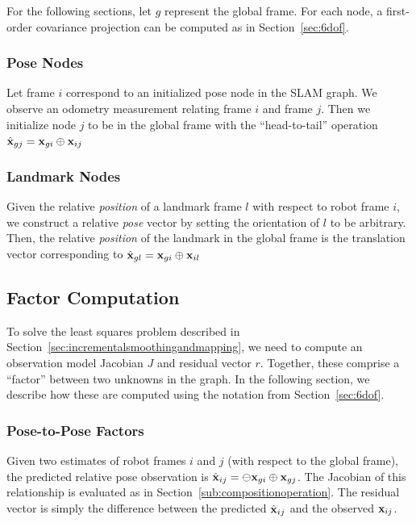 \documentclass[conference]{IEEEtran}
\begin{document}
For the following sections, let $g$ represent the global frame.  For each node, a
first-order covariance projection can be computed as in Section~\ref{sec:6dof}.

\subsubsection{Pose Nodes}
\label{subs:posenodeinit}

Let frame $i$ correspond to an initialized pose node in the \ac{SLAM} graph.  We observe an
odometry measurement relating frame $i$ and frame $j$.  Then we initialize node $j$ to be
in the global frame with the ``head-to-tail'' operation $ {\hat {\bf x}_{gj}} = {\bf
  x}_{gi} \oplus {\bf x}_{ij} $

\subsubsection{Landmark Nodes}
\label{subs:pointnodeinit}
Given the relative {\it position} of a landmark frame $l$ with respect to robot frame $i$,
we construct a relative {\it pose} vector by setting the orientation of $l$ to be
arbitrary.  Then, the relative {\it position} of the landmark in the global frame is the
translation vector corresponding to $ {\hat {\bf x}}_{gl} = {\bf x}_{gi} \oplus {\bf
 x}_{il} $

\subsection{Factor Computation}
\label{sub:nodeinitializationandedgeresiduals}

To solve the least squares problem described in
Section~\ref{sec:incrementalsmoothingandmapping}, we need to compute an observation model
Jacobian $J$ and residual vector $r$.  Together, these comprise a ``factor'' between two
unknowns in the graph.  In the following section, we describe how these are computed using
the notation from Section~\ref{sec:6dof}.

\subsubsection{Pose-to-Pose Factors}
\label{subs:posenodelinear}
Given two estimates of robot frames $i$ and $j$ (with respect to the global frame), the
predicted relative pose observation is $ {\hat {\bf x}_{ij}} = \ominus {\bf x}_{gi} \oplus
{\bf x}_{gj}$. The Jacobian of this relationship is evaluated as in
Section~\ref{sub:compositionoperation}.  The residual vector is simply the difference
between the predicted ${\hat {\bf x}_{ij}}$ and the observed ${\bf x}_{ij}$.
\end{document}
